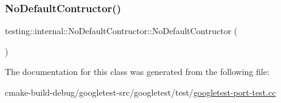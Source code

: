 \mbox{\label{classtesting_1_1internal_1_1NoDefaultContructor_acba74b55a8c5341808ecb5b9318eaecf}} 
\subsubsection{\texorpdfstring{NoDefaultContructor()}{NoDefaultContructor()}\hspace{0.1cm}{\footnotesize\ttfamily [2/2]}}
{\footnotesize\ttfamily testing\+::internal\+::\+No\+Default\+Contructor\+::\+No\+Default\+Contructor (\begin{DoxyParamCaption}\item[{const \mbox{\hyperlink{classtesting_1_1internal_1_1NoDefaultContructor}{No\+Default\+Contructor}} \&}]{ }\end{DoxyParamCaption})\hspace{0.3cm}{\ttfamily [inline]}}



The documentation for this class was generated from the following file\+:\begin{DoxyCompactItemize}
\item 
cmake-\/build-\/debug/googletest-\/src/googletest/test/\mbox{\hyperlink{googletest-port-test_8cc}{googletest-\/port-\/test.\+cc}}\end{DoxyCompactItemize}
